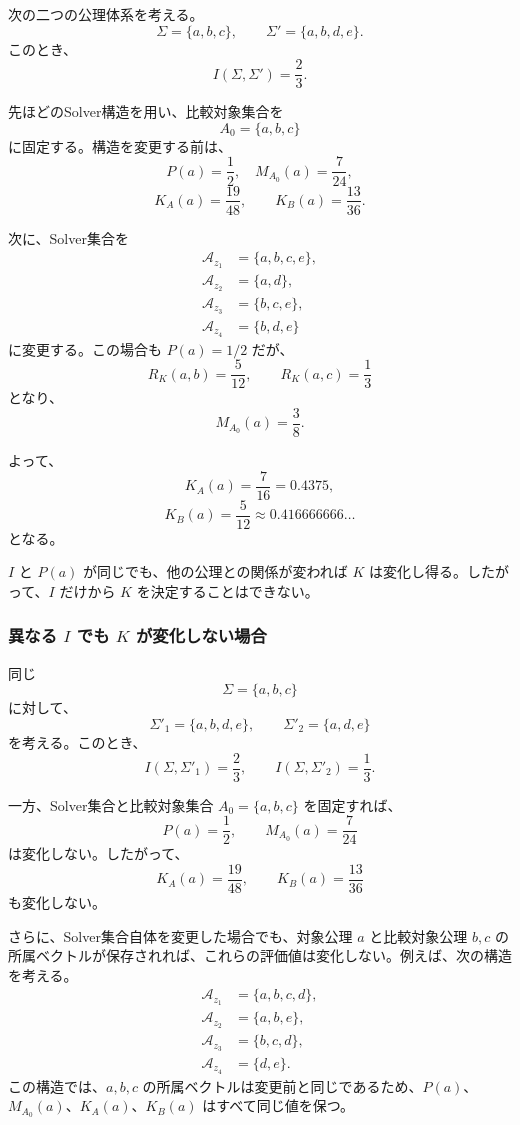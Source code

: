 \documentclass[a4paper,11pt]{ltjsarticle}
\begin{document}
次の二つの公理体系を考える。
\[
\Sigma=\{a,b,c\},\qquad
\Sigma'=\{a,b,d,e\}.
\]
このとき、
\[
I(\Sigma,\Sigma')=\frac23.
\]

先ほどのSolver構造を用い、比較対象集合を
\[
A_0=\{a,b,c\}
\]
に固定する。構造を変更する前は、
\[
P(a)=\frac12,\quad
M_{A_0}(a)=\frac7{24},
\]
\[
K_A(a)=\frac{19}{48},\qquad
K_B(a)=\frac{13}{36}.
\]

次に、Solver集合を
\[
\begin{aligned}
\mathcal{A}_{z_1}&=\{a,b,c,e\},\\
\mathcal{A}_{z_2}&=\{a,d\},\\
\mathcal{A}_{z_3}&=\{b,c,e\},\\
\mathcal{A}_{z_4}&=\{b,d,e\}
\end{aligned}
\]
に変更する。この場合も $P(a)=1/2$ だが、
\[
R_K(a,b)=\frac5{12},\qquad
R_K(a,c)=\frac13
\]
となり、
\[
M_{A_0}(a)=\frac38.
\]

よって、
\[
K_A(a)=\frac7{16}=0.4375,
\]
\[
K_B(a)=\frac5{12}
\approx 0.416666666\ldots
\]
となる。

$I$ と $P(a)$ が同じでも、他の公理との関係が変われば $K$ は変化し得る。したがって、$I$ だけから $K$ を決定することはできない。

\subsubsection{異なる $I$ でも $K$ が変化しない場合}

同じ
\[
\Sigma=\{a,b,c\}
\]
に対して、
\[
\Sigma'_1=\{a,b,d,e\},\qquad
\Sigma'_2=\{a,d,e\}
\]
を考える。このとき、
\[
I(\Sigma,\Sigma'_1)=\frac23,\qquad
I(\Sigma,\Sigma'_2)=\frac13.
\]

一方、Solver集合と比較対象集合 $A_0=\{a,b,c\}$ を固定すれば、
\[
P(a)=\frac12,\qquad
M_{A_0}(a)=\frac7{24}
\]
は変化しない。したがって、
\[
K_A(a)=\frac{19}{48},\qquad
K_B(a)=\frac{13}{36}
\]
も変化しない。

さらに、Solver集合自体を変更した場合でも、対象公理 $a$ と比較対象公理 $b,c$ の所属ベクトルが保存されれば、これらの評価値は変化しない。例えば、次の構造を考える。
\[
\begin{aligned}
\mathcal{A}_{z_1}&=\{a,b,c,d\},\\
\mathcal{A}_{z_2}&=\{a,b,e\},\\
\mathcal{A}_{z_3}&=\{b,c,d\},\\
\mathcal{A}_{z_4}&=\{d,e\}.
\end{aligned}
\]
この構造では、$a,b,c$ の所属ベクトルは変更前と同じであるため、$P(a)$、$M_{A_0}(a)$、$K_A(a)$、$K_B(a)$ はすべて同じ値を保つ。
\end{document}
